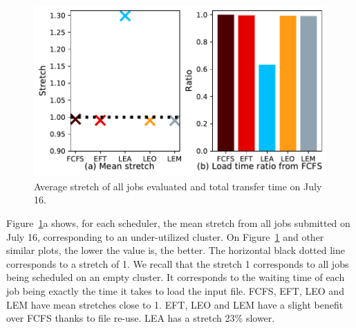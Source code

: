 \documentclass[conference,10pt]{IEEEtran}
\begin{document}
\begin{figure}[t]\centering\includegraphics[width=0.9\linewidth]{../MBSS/plot/Results_FCFS_Score_Backfill_2022-07-16->2022-07-16_V10000_Mean_Stretch_Total_waiting_for_a_load_time_and_transfer_time_450_128_32_256_4_1024.pdf}\caption{Average stretch of all jobs evaluated and total transfer time on July 16.}\label{stretch.07-16}\end{figure}

Figure~\ref{stretch.07-16}a shows, for each scheduler, the mean stretch from all jobs
submitted on July 16, corresponding to an under-utilized
cluster.
On Figure~\ref{stretch.07-16} and other similar plots, the lower the value is, the better.
The horizontal black dotted line corresponds to a stretch of 1.
We recall that the stretch 1 corresponds to all jobs being
scheduled on an empty cluster. It corresponds to the waiting time of each job being exactly
the time it takes to load the input file.
FCFS, EFT, LEO and LEM have mean stretches close to 1.
EFT, LEO and LEM have a slight benefit over FCFS thanks to file re-use.
LEA has a stretch 23\% slower.
\end{document}
